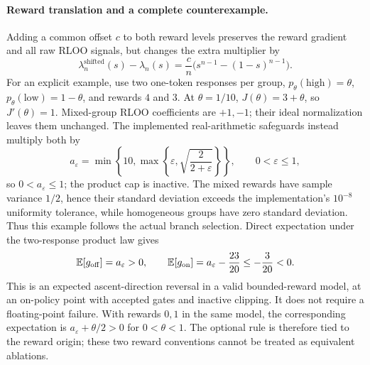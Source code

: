 \paragraph{Reward translation and a complete counterexample.}
Adding a common offset $c$ to both reward levels preserves the reward
gradient and all raw RLOO signals, but changes the extra multiplier by
\begin{equation*}
    \lambda_n^{\mathrm{shifted}}(s)-\lambda_n(s)
      =\frac{c}{n}\bigl(s^{n-1}-(1-s)^{n-1}\bigr).
\end{equation*}
For an explicit example, use two one-token responses per group,
$p_\theta(\mathrm{high})=\theta$,
$p_\theta(\mathrm{low})=1-\theta$, and rewards $4$ and $3$.
At $\theta=1/10$, $J(\theta)=3+\theta$, so $J'(\theta)=1$.
Mixed-group RLOO coefficients are $+1,-1$; their ideal normalization
leaves them unchanged. The implemented real-arithmetic safeguards instead
multiply both by
\begin{equation*}
    a_\varepsilon
      =\min\!\left\{10,\max\!\left\{\varepsilon,
                  \sqrt{\frac{2}{2+\varepsilon}}\right\}\right\},
    \qquad 0<\varepsilon\le1,
\end{equation*}
so $0<a_\varepsilon\le1$; the product cap is inactive. The mixed rewards
have sample variance $1/2$, hence their standard deviation exceeds the
implementation's $10^{-8}$ uniformity tolerance, while homogeneous groups
have zero standard deviation. Thus this example follows the actual branch
selection. Direct expectation under the two-response product law gives
\begin{equation}
    \mathbb{E}[g_{\mathrm{off}}]=a_\varepsilon>0,
    \qquad
    \mathbb{E}[g_{\mathrm{on}}]=a_\varepsilon-\frac{23}{20}
       \le-\frac{3}{20}<0.
    \label{eq:uniform-offset-counterexample}
\end{equation}
This is an expected ascent-direction reversal in a valid bounded-reward
model, at an on-policy point with accepted gates and inactive clipping.
It does not require a floating-point failure. With rewards $0,1$ in the
same model, the corresponding expectation is
$a_\varepsilon+\theta/2>0$ for $0<\theta<1$.
The optional rule is therefore tied to the reward origin; these two reward
conventions cannot be treated as equivalent ablations.

